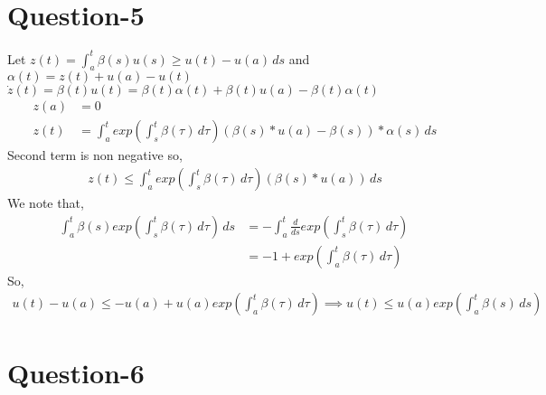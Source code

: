 \documentclass{article}
\begin{document}
\section*{Question-5}
Let $z(t) = \int_a^t \beta(s)u(s) \geq u(t) - u(a)\,ds$ and $\alpha(t) = z(t) + u(a) - u(t) $ \\
$\dot{z}(t) = \beta(t)u(t) = \beta(t)\alpha(t) + \beta(t)u(a) - \beta(t)\alpha(t)$
\begin{align*}
    z(a) &= 0 \\
    z(t) &= \int_a^t exp(\int_s^t\beta(\tau)\,d\tau)(\beta(s)*u(a) - \beta(s))*\alpha(s)   \,ds
\end{align*}
Second term is non negative so,
\begin{align*}
    z(t) \leq \int_a^t exp(\int_s^t\beta(\tau)\,d\tau)(\beta(s)*u(a))\,ds
\end{align*}
We note that,
\begin{align*}
    \int_a^t \beta(s)exp(\int_s^t\beta(\tau)\,d\tau)\,ds &= - \int_a^t \frac{d}{ds}exp(\int_s^t\beta(\tau)\,d\tau)\, \\
    &= - 1 + exp(\int_a^t\beta(\tau)\,d\tau)
\end{align*}
So, 
\begin{align*}
    u(t) - u(a) \leq -u(a) + u(a)exp(\int_a^t\beta(\tau)\,d\tau)
    \implies u(t) \leq u(a)exp(\int_a^t\beta(s)\,ds)
\end{align*}


\section*{Question-6}
\end{document}
